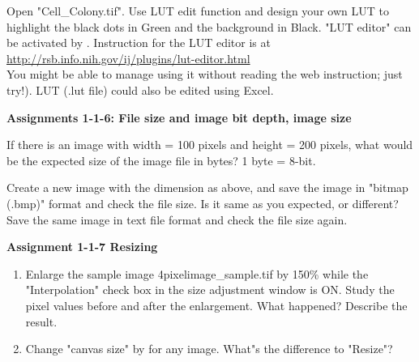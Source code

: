 Open "Cell\_Colony.tif". Use LUT edit function and design your own LUT to highlight the black dots in
Green and the background in Black. "LUT editor" can be activated by . Instruction for the LUT editor is at\\
\url{http://rsb.info.nih.gov/ij/plugins/lut-editor.html} \\
You might be able to manage using it without reading the web instruction; just try!). LUT (.lut file) could also be edited using Excel. 

\textbf{\sffamily
Assignments 1-1-6: File size and image bit depth, image size}

If there is an image with width = 100 pixels and height = 200 pixels,
what would be the expected size of the image file in bytes? 1 byte =
8-bit.

Create a new image with the dimension as above, and save the image in
"bitmap (.bmp)" format and check the file
size. Is it same as you expected, or different? Save the same image in
text file format and check the file size again.

\textbf{\sffamily
Assignment 1-1-7 Resizing}

\begin{enumerate}
\item Enlarge the sample image 4pixelimage\_sample.tif by
150\% while the "Interpolation"
check box in the size adjustment window is ON. Study the pixel values
before and after the enlargement. What happened? Describe the result.

\item Change "canvas size" by  for any image. What"s the
difference to "Resize"?
\end{enumerate}


